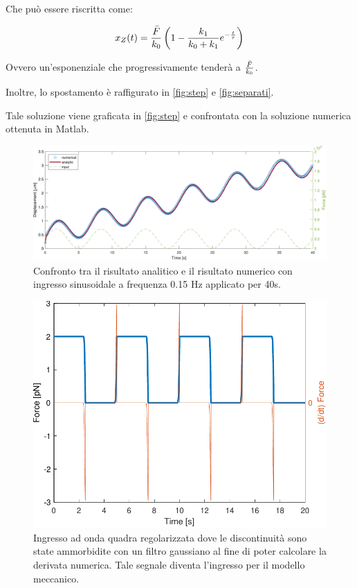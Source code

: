 Che può essere riscritta come:

\begin{equation}
	x_Z(t)={\bar F\over k_0}\left(1-{k_1\over k_0+k_1}e^{-{t\over \tau}}\right)
\end{equation}

Ovvero un'esponenziale che progressivamente tenderà a $\bar F\over k_0$. 

Inoltre, lo spostamento è raffigurato in \cref{fig:step} e \cref{fig:separati}.


Tale soluzione viene graficata in \cref{fig:step} e confrontata con la soluzione numerica ottenuta in Matlab.




\begin{figure}[t!]
	\centering
	\includegraphics[width=0.95\linewidth]{../code/figs/harmoniclarge}
	\caption{Confronto tra il risultato analitico e il risultato numerico con ingresso sinusoidale a frequenza 0.15 Hz applicato per 40s.}
	\label{fig:harmoniclarge}
\end{figure}

\begin{figure}[b!]
	\centering
	\includegraphics[width=0.95\linewidth]{../code/figs/square_regularized}
	\caption{Ingresso ad onda quadra regolarizzata dove le discontinuità sono state ammorbidite con un filtro gaussiano al fine di poter calcolare la derivata numerica. Tale segnale diventa l'ingresso per il modello meccanico.}
	\label{fig:squareregularized}
\end{figure}


